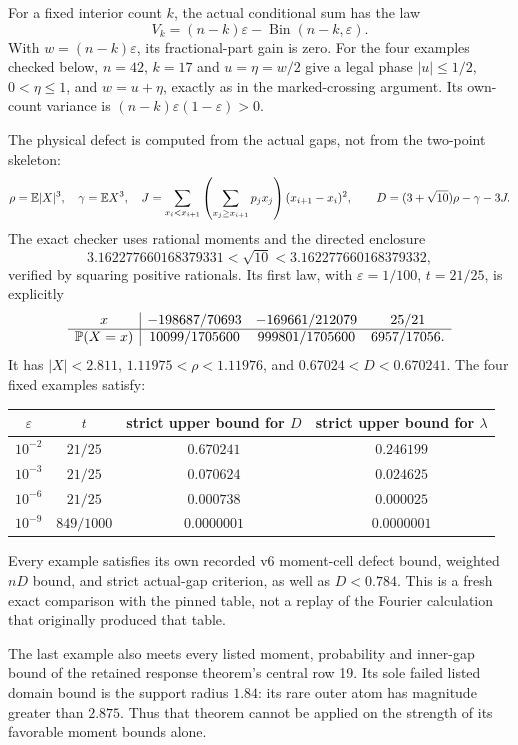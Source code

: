 For a fixed interior count $k$, the actual conditional sum has the law
\[
 V_k=(n-k)\varepsilon-\operatorname{Bin}(n-k,\varepsilon).
\]
With $w=(n-k)\varepsilon$, its fractional-part gain is zero. For the four
examples checked below, $n=42$, $k=17$ and
$u=\eta=w/2$ give a legal phase $|u|\le1/2$, $0<\eta\le1$, and
$w=u+\eta$, exactly as in the marked-crossing argument. Its own-count
variance is $(n-k)\varepsilon(1-\varepsilon)>0$.

The physical defect is computed from the actual gaps, not from the
two-point skeleton:
\[
 \rho=\mathbb E|X|^3,\quad\gamma=\mathbb E X^3,\quad
 J=\sum_{x_i<x_{i+1}}
       \left(\sum_{x_j\ge x_{i+1}}p_jx_j\right)(x_{i+1}-x_i)^2,
 \qquad D=(3+\sqrt{10})\rho-\gamma-3J.
\]
The exact checker uses rational moments and the directed enclosure
\[
 3.162277660168379331<\sqrt{10}<3.162277660168379332,
\]
verified by squaring positive rationals. Its first law, with
$\varepsilon=1/100$, $t=21/25$, is explicitly
\[
\begin{array}{c|ccc}
x&-198687/70693&-169661/212079&25/21\\\hline
\mathbb P(X=x)&10099/1705600&999801/1705600&6957/17056.
\end{array}
\]
It has $|X|<2.811$, $1.11975<\rho<1.11976$, and
$0.67024<D<0.670241$. The four fixed examples satisfy:
\begin{center}\small
\begin{tabular}{@{}cccc@{}}\toprule
$\varepsilon$ & $t$ & strict upper bound for $D$ & strict upper bound for $\lambda$\\\midrule
$10^{-2}$ & $21/25$ & $0.670241$ & $0.246199$\\
$10^{-3}$ & $21/25$ & $0.070624$ & $0.024625$\\
$10^{-6}$ & $21/25$ & $0.000738$ & $0.000025$\\
$10^{-9}$ & $849/1000$ & $0.0000001$ & $0.0000001$\\\bottomrule
\end{tabular}
\end{center}
Every example satisfies its own recorded v6 moment-cell defect bound,
weighted $nD$ bound, and strict actual-gap criterion, as well as $D<0.784$.
This is a fresh exact comparison with the pinned table, not a replay of
the Fourier calculation that originally produced that table.

The last example also meets every listed moment, probability and inner-gap
bound of the retained response theorem's central row 19. Its sole failed
listed domain bound is the support radius $1.84$: its rare outer atom has
magnitude greater than $2.875$. Thus that theorem cannot be applied on
the strength of its favorable moment bounds alone.


